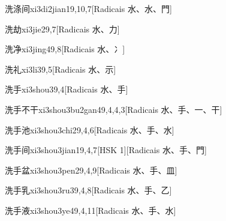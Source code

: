 \begin{entry}{洗涤间}{xi3di2jian1}{9,10,7}[Radicais ⽔、⽔、⾨]
\end{entry}

\begin{entry}{洗劫}{xi3jie2}{9,7}[Radicais ⽔、⼒]
\end{entry}

\begin{entry}{洗净}{xi3jing4}{9,8}[Radicais ⽔、⼎]
\end{entry}

\begin{entry}{洗礼}{xi3li3}{9,5}[Radicais ⽔、⽰]
\end{entry}

\begin{entry}{洗手}{xi3shou3}{9,4}[Radicais ⽔、⼿]
\end{entry}

\begin{entry}{洗手不干}{xi3shou3bu2gan4}{9,4,4,3}[Radicais ⽔、⼿、⼀、⼲]
\end{entry}

\begin{entry}{洗手池}{xi3shou3chi2}{9,4,6}[Radicais ⽔、⼿、⽔]
\end{entry}

\begin{entry}{洗手间}{xi3shou3jian1}{9,4,7}[HSK 1][Radicais ⽔、⼿、⾨]
\end{entry}

\begin{entry}{洗手盆}{xi3shou3pen2}{9,4,9}[Radicais ⽔、⼿、⽫]
\end{entry}

\begin{entry}{洗手乳}{xi3shou3ru3}{9,4,8}[Radicais ⽔、⼿、⼄]
\end{entry}

\begin{entry}{洗手液}{xi3shou3ye4}{9,4,11}[Radicais ⽔、⼿、⽔]
\end{entry}


